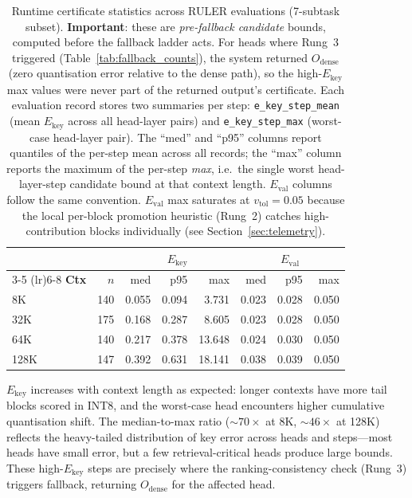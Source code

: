 \documentclass[10pt,twocolumn,a4paper]{article}
\theoremstyle{definition}
\theoremstyle{remark}
\begin{document}
\begin{table}[!t]
\centering
\caption{Runtime certificate statistics across RULER evaluations (7-subtask subset).  \textbf{Important}: these are \emph{pre-fallback candidate} bounds, computed before the fallback ladder acts.  For heads where Rung~3 triggered (Table~\ref{tab:fallback_counts}), the system returned $O_{\mathrm{dense}}$ (zero quantisation error relative to the dense path), so the high-$E_{\mathrm{key}}$ max values were never part of the returned output's certificate.  Each evaluation record stores two summaries per step: \texttt{e\_key\_step\_mean} (mean $E_{\mathrm{key}}$ across all head-layer pairs) and \texttt{e\_key\_step\_max} (worst-case head-layer pair).  The ``med'' and ``p95'' columns report quantiles of the per-step mean across all records; the ``max'' column reports the maximum of the per-step \emph{max}, i.e.\ the single worst head-layer-step candidate bound at that context length.  $E_{\mathrm{val}}$ columns follow the same convention.  $E_{\mathrm{val}}$ max saturates at $v_{\mathrm{tol}}{=}0.05$ because the local per-block promotion heuristic (Rung~2) catches high-contribution blocks individually (see Section~\ref{sec:telemetry}).}
\label{tab:telemetry}
\small
\begin{tabular}{lrrrrrrr}
\toprule
& & \multicolumn{3}{c}{\textbf{$E_{\mathrm{key}}$}} & \multicolumn{3}{c}{\textbf{$E_{\mathrm{val}}$}} \\
\cmidrule(lr){3-5} \cmidrule(lr){6-8}
\textbf{Ctx} & $n$ & med & p95 & max & med & p95 & max \\
\midrule
8K   & 140 & 0.055 & 0.094 & 3.731 & 0.023 & 0.028 & 0.050 \\
32K  & 175 & 0.168 & 0.287 & 8.605 & 0.023 & 0.028 & 0.050 \\
64K  & 140 & 0.217 & 0.378 & 13.648 & 0.024 & 0.030 & 0.050 \\
128K & 147 & 0.392 & 0.631 & 18.141 & 0.038 & 0.039 & 0.050 \\
\bottomrule
\end{tabular}
\end{table}

$E_{\mathrm{key}}$ increases with context length as expected: longer contexts have more tail blocks scored in INT8, and the worst-case head encounters higher cumulative quantisation shift.  The median-to-max ratio (${\sim}70\times$ at 8K, ${\sim}46\times$ at 128K) reflects the heavy-tailed distribution of key error across heads and steps---most heads have small error, but a few retrieval-critical heads produce large bounds.  These high-$E_{\mathrm{key}}$ steps are precisely where the ranking-consistency check (Rung~3) triggers fallback, returning $O_{\mathrm{dense}}$ for the affected head.
\end{document}
